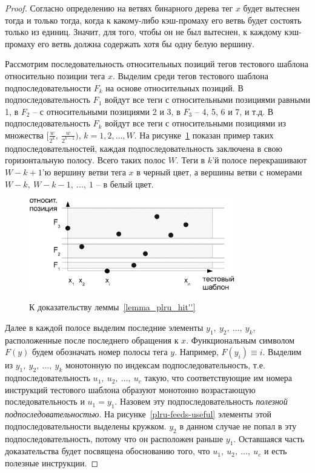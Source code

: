 \begin{proof}
  Согласно определению на ветвях бинарного дерева тег $x$ будет
  вытеснен тогда и только тогда, когда к какому-либо кэш-промаху его
  ветвь будет состоять только из единиц. Значит, для того, чтобы он
  не был вытеснен, к каждому кэш-промаху его ветвь должна содержать
  хотя бы одну белую вершину.

  Рассмотрим последовательность относительных позиций тегов
  тестового шаблона относительно позиции тега $x$. Выделим среди
  тегов тестового шаблона подпоследовательности $F_k$ на основе
  относительных позиций. В подпоследовательность $F_1$ войдут все теги
  с относительными позициями равными 1, в $F_2$ -- с
  относительными позициями 2 и 3, в $F_3$ -- 4, 5, 6 и 7, и т.д. В
  подпоследовательность $F_k$ войдут все теги с относительными позициями
  из множества $[\frac{w}{2^k},~\frac{w}{2^{k-1}})$, $k = 1, 2,
  \dots, W$. На рисунке~\ref{plru-feeds} показан пример таких
  подпоследовательностей, каждая подпоследовательность заключена в
  свою горизонтальную полосу. Всего таких полос $W$. Теги в $k$'й
  полосе перекрашивают $W-k+1$'ю вершину ветви тега $x$ в черный цвет, а
  вершины ветви с номерами $W{-}k,~W{-}k{-}1,~...,~1$ -- в белый цвет.

\begin{figure}[h] \center
  \includegraphics[width=0.8\textwidth]{2.theor/plru-feeds}\\
  \caption{К доказательству леммы~\ref{lemma_plru_hit''}}\label{plru-feeds}
\end{figure}

  Далее в каждой полосе выделим последние элементы
  $y_1,~y_2,~\dots,~y_k$, расположенные после последнего обращения к
  $x$. Функциональным символом $F(y)$ будем обозначать номер полосы
  тега $y$. Например, $F(y_i) \equiv i$. Выделим из
  $y_1,~y_2,~\dots,~y_k$ монотонную по индексам
  подпоследовательность, т.е. подпоследовательность
  $u_1,~u_2,~\dots,~u_c$ такую, что соответствующие им номера
  инструкций тестового шаблона образуют монотонно возрастающую
  последовательность и $u_1 = y_1$. Назовем эту
  подпоследовательность \emph{полезной подпоследовательностью}. На
  рисунке~\ref{plru-feeds-useful} элементы этой
  подпоследовательности выделены кружком. $y_2$ в данном случае не
  попал в эту подпоследовательность, потому что он расположен раньше
  $y_1$. Оставшаяся часть доказательства будет посвящена обоснованию
  того, что $u_1,~u_2,~\dots,~u_c$ и есть полезные инструкции.


\end{proof}

